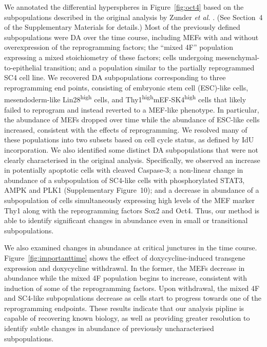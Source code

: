 \documentclass{article}
\newcommand{\suppannotate}{4}
\newcommand{\suppfignonlinear}{10}
\begin{document}
We annotated the differential hyperspheres in Figure~\ref{fig:oct4} based on the subpopulations described in the original analysis by Zunder \emph{et al.} \cite{zunder2015continuous}.
(See Section~\suppannotate{} of the Supplementary Materials for details.)
Most of the previously defined subpopulations were DA over the time course, including MEFs with and without overexpression of the reprogramming factors; 
    the ``mixed 4F'' population expressing a mixed stoichiometry of these factors; 
    cells undergoing mesenchymal-to-epithelial transition; 
    and a population similar to the partially reprogrammed SC4 cell line.
We recovered DA subpopulations corresponding to three reprogramming end points, consisting of embryonic stem cell (ESC)-like cells, mesendoderm-like Lin28\textsuperscript{high} cells, and Thy1\textsuperscript{high}mEF-SK4\textsuperscript{high} cells that likely failed to reprogram and instead reverted to a MEF-like phenotype.
In particular, the abundance of MEFs dropped over time while the abundance of ESC-like cells increased, consistent with the effects of reprogramming.
We resolved many of these populations into two subsets based on cell cycle status, as defined by IdU incorporation.
We also identified some distinct DA subpopulations that were not clearly characterised in the original analysis.
Specifically, we observed an increase in potentially apoptotic cells with cleaved Caspase-3;
    a non-linear change in abundance of a subpopulation of SC4-like cells with phosphorylated STAT3, AMPK and PLK1 (Supplementary Figure~\suppfignonlinear{});
    and a decrease in abundance of a subpopulation of cells simultaneously expressing high levels of the MEF marker Thy1 along with the reprogramming factors Sox2 and Oct4.
Thus, our method is able to identify significant changes in abundance even in small or transitional subpopulations.

We also examined changes in abundance at critical junctures in the time course.
Figure~\ref{fig:importanttime} shows the effect of doxycycline-induced transgene expression and doxycycline withdrawal.
In the former, the MEFs decrease in abundance while the mixed 4F population begins to increase, consistent with induction of some of the reprogramming factors.
Upon withdrawal, the mixed 4F and SC4-like subpopulations decrease as cells start to progress towards one of the reprogramming endpoints.
These results indicate that our analysis pipline is capable of recovering known biology, as well as providing greater resolution to identify subtle changes in abundance of previously uncharacterised subpopulations.
\end{document}
